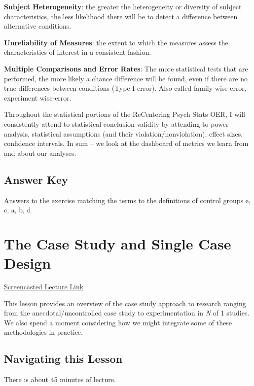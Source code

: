 \documentclass[
  english,
]{book}
\begin{document}
\textbf{Subject Heterogeneity}: the greater the heterogeneity or diversity of subject characteristics, the less likelihood there will be to detect a difference between alternative conditions.

\textbf{Unreliability of Measures}: the extent to which the measures assess the characteristics of interest in a consistent fashion.

\textbf{Multiple Comparisons and Error Rates}: The more statistical tests that are performed, the more likely a chance difference will be found, even if there are no true differences between conditions (Type I error). Also called family-wise error, experiment wise-error.

Throughout the statistical portions of the ReCentering Psych Stats OER, I will consistently attend to statistical conclusion validity by attending to power analysis, statistical assumptions (and their violation/nonviolation), effect sizes, confidence intervals. In sum -- we look at the dashboard of metrics we learn from and about our analyses.

\hypertarget{answer-key}{%
\section{Answer Key}\label{answer-key}}

Answers to the exercise matching the terms to the definitions of control groups
e, c, a, b, d

\hypertarget{SingleCase}{%
\chapter{The Case Study and Single Case Design}\label{SingleCase}}

\href{HTTPS://SPU.HOSTED.PANOPTO.COM/PANOPTO/PAGES/VIEWER.ASPX?PID=5876A17E-CAF9-4E67-BA30-AAD2016A7C9C}{Screencasted Lecture Link}

This lesson provides an overview of the case study approach to research ranging from the anecdotal/uncontrolled case study to experimentation in \emph{N} of 1 studies. We also spend a moment considering how we might integrate some of these methodologies in practice.

\hypertarget{navigating-this-lesson-3}{%
\section{Navigating this Lesson}\label{navigating-this-lesson-3}}

There is about 45 minutes of lecture.
\end{document}
